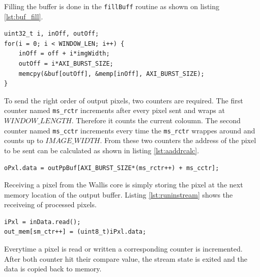Filling the buffer is done in the \texttt{fillBuff} routine
as shown on listing \ref{lst:buf_fill}.

\begin{minipage}{\textwidth}
\begin{lstlisting}[style=CStyle, caption=Buffer fill simplified,
label=lst:buf_fill]
uint32_t i, inOff, outOff;
for(i = 0; i < WINDOW_LEN; i++) {
    inOff = off + i*imgWidth;
    outOff = i*AXI_BURST_SIZE;
    memcpy(&buf[outOff], &memp[inOff], AXI_BURST_SIZE);
}\end{lstlisting}
\end{minipage}

To send the right order of output pixels, two counters are required. The first
counter named \texttt{ms\_rctr} increments after every pixel sent and wraps at
$WINDOW\_LENGTH$. Therefore it counts the current coloumn. The second counter
named \texttt{ms\_cctr} increments every time the \texttt{ms\_rctr} wrappes
around and counts up to $IMAGE\_WIDTH$. From these two counters the address of
the pixel to be sent can be calculated as shown in listing \ref{lst:aaddrcalc}.

\begin{minipage}{\textwidth}
\begin{lstlisting}[style=CStyle, caption=Pixel send address calculation,
label=lst:aaddrcalc]
oPxl.data = outPpBuf[AXI_BURST_SIZE*(ms_rctr++) + ms_cctr];\end{lstlisting}
\end{minipage}

Receiving a pixel from the Wallis core is simply storing the pixel at the next
memory location of the
output buffer. Listing \ref{lst:runinstream} shows the receiveing of processed
pixels.

\begin{minipage}{\textwidth}
\begin{lstlisting}[style=CStyle, caption=Pixel read store,
label=lst:runinstream]
iPxl = inData.read();
out_mem[sm_ctr++] = (uint8_t)iPxl.data;\end{lstlisting}
\end{minipage}

Everytime a pixel is read or written a corresponding counter is incremented.
After both counter hit their compare value, the stream state is exited and the
data is copied back to memory.

\pagebreak
